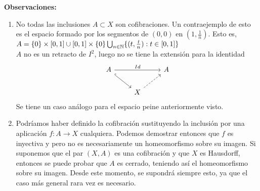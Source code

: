 \textbf{Observaciones:}
\begin{enumerate}
\item No todas las inclusiones $A \subset X$ son cofibraciones. Un contraejemplo de esto es el espacio formado por los segmentos de $(0, 0)$ en $(1, \frac{1}{n})$.
Esto es, $ A = \{0\} \times [0,1] \cup [0,1] \times \{0\} \bigcup_{n \in \mathbb{N}} \{ (t, \frac{t}{n}) : t \in [0,1] \} $  \\
$A$ no es un retracto de $I^2$, luego no se tiene la extensión para la identidad 
\[ 
\begin{tikzcd}
A \arrow{rr}{Id} \drar[hook] & & A \\
 & X \urar[dashed] &
\end{tikzcd}
\]
Se tiene un caso análogo para el espacio peine anteriormente visto.

\item Podríamos haber definido la cofibración sustituyendo la inclusión por una aplicación $f : A \longrightarrow X $ cualquiera. Podemos demostrar entonces que $f$ es inyectiva y pero no es necesariamente un homeomorfismo sobre su imagen. Si suponemos que el par $(X, A)$ es una cofibración y que $X$ es Hausdorff, entonces se puede probar que $A$ es cerrado, teniendo así el homeomorfismo sobre su imagen. Desde este momento, se supondrá siempre esto, ya que el caso más general rara vez es necesario.
\end{enumerate}

